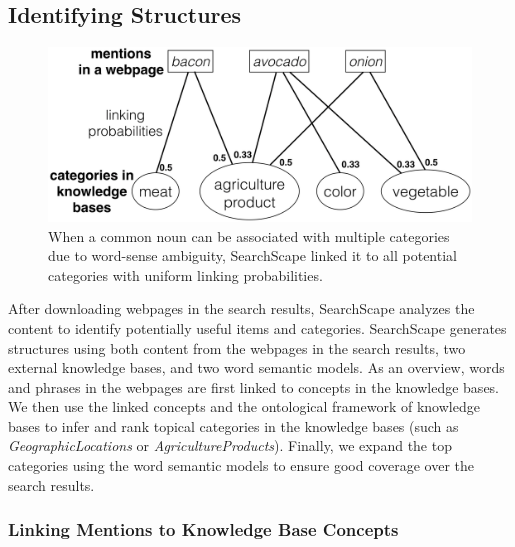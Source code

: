 \subsection{Identifying Structures}

\begin{figure}
    \centering
    \includegraphics[width=0.5\columnwidth]{Chapters/SearchScape/figures/wsd.png}
    \caption[Word-sense disambiguation in SearchScape.]{When a common noun can be associated with multiple categories due to word-sense ambiguity, SearchScape linked it to all potential categories with uniform linking probabilities.}
    \label{fig:wsd}
\end{figure}


After downloading webpages in the search results, SearchScape analyzes the content to identify potentially useful items and categories. SearchScape generates structures using both content from the webpages in the search results, two external knowledge bases, and two word semantic models. As an overview, words and phrases in the webpages are first linked to concepts in the knowledge bases. We then use the linked concepts and the ontological framework of knowledge bases to infer and rank topical categories in the knowledge bases (such as \emph{GeographicLocations} or \emph{AgricultureProducts}). Finally, we expand the top categories using the word semantic models to ensure good coverage over the search results.

\subsubsection{Linking Mentions to Knowledge Base Concepts}

